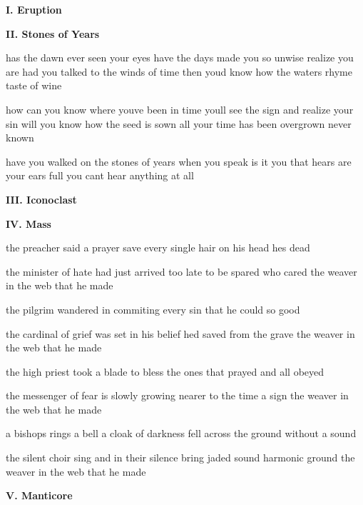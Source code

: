 \documentclass{article}
\renewcommand{\part}[1]{
  \begin{center}
    \textbf{#1}
  \end{center}
  \fontcream
}
\begin{document}
\noindent

\part{I. Eruption}

\part{II. Stones of Years}

has the dawn ever seen your eyes
have the days made you so unwise
realize you are
had you talked to the winds of time
then youd know how the waters rhyme
taste of wine

how can you know where youve been
in time youll see the sign
and realize your sin
will you know how the seed is sown
all your time has been overgrown
never known

have you walked on the stones of years
when you speak is it you that hears
are your ears full
you cant hear anything at all

\part{III. Iconoclast}

\part{IV. Mass}

the preacher said a prayer
save every single hair on his head
hes dead

the minister of hate had just arrived too late to be spared
who cared
the weaver in the web that he made

the pilgrim wandered in
commiting every sin that he could
so good

the cardinal of grief was set in his belief hed saved
from the grave
the weaver in the web that he made

the high priest took a blade
to bless the ones that prayed
and all obeyed

the messenger of fear is slowly growing nearer to the time
a sign
the weaver in the web that he made

a bishops rings a bell
a cloak of darkness fell across the ground
without a sound

the silent choir sing and in their silence
bring jaded sound harmonic ground
the weaver in the web that he made

\part{V. Manticore}
\end{document}
